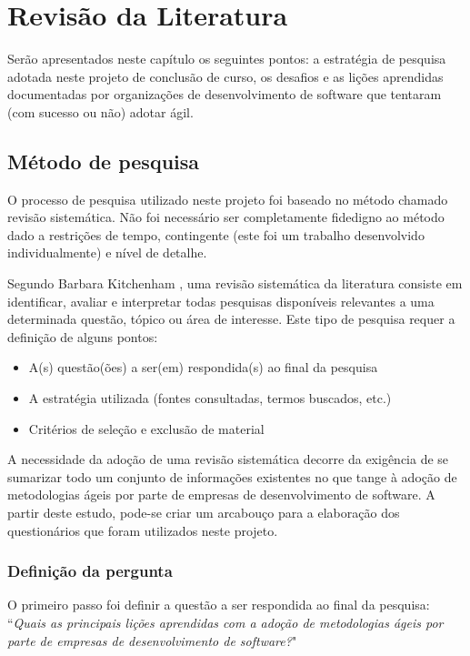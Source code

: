 \chapter{Revisão da Literatura}
	Serão apresentados neste capítulo os seguintes pontos: a estratégia de pesquisa adotada neste projeto de conclusão de curso, os desafios e as lições aprendidas documentadas por organizações de desenvolvimento de software que tentaram (com sucesso ou não) adotar ágil.
	\section{Método de pesquisa}
		O processo de pesquisa utilizado neste projeto foi baseado no método chamado revisão sistemática. Não foi necessário ser completamente fidedigno ao método dado a restrições de tempo, contingente (este foi um trabalho desenvolvido individualmente) e nível de detalhe.
		
		Segundo Barbara Kitchenham \cite{Barbara04}, uma revisão sistemática da literatura consiste em identificar, avaliar e interpretar todas pesquisas disponíveis relevantes a uma determinada questão, tópico ou área de interesse. Este tipo de pesquisa requer a definição de alguns pontos:
		\begin{itemize}
			\item A(s) questão(ões) a ser(em) respondida(s) ao final da pesquisa
			\item A estratégia utilizada (fontes consultadas, termos buscados, etc.)
			\item Critérios de seleção e exclusão de material
		\end{itemize}
		A necessidade da adoção de uma revisão sistemática decorre da exigência de se sumarizar todo um conjunto de informações existentes no que tange à adoção de metodologias ágeis por parte de empresas de desenvolvimento de software. A partir deste estudo, pode-se criar um arcabouço para a elaboração dos questionários que foram utilizados neste projeto.
		\subsection{Definição da pergunta}
			O primeiro passo foi definir a questão a ser respondida ao final da pesquisa: ``\textit{Quais as principais lições aprendidas com a adoção de metodologias ágeis por parte de empresas de desenvolvimento de software?}"
